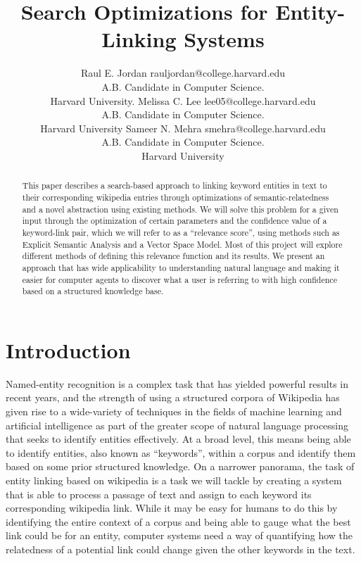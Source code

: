 \documentclass[twoside,11pt]{article}
\begin{document}
\title{Search Optimizations for Entity-Linking Systems}

\author{\name Raul E. Jordan \email rauljordan@college.harvard.edu \\
       \addr A.B. Candidate in Computer Science. \\ Harvard University.
       \AND
       \name Melissa C. Lee \email lee05@college.harvard.edu \\
       \addr A.B. Candidate in Computer Science. \\
       Harvard University
       \AND
       \name Sameer N. Mehra \email smehra@college.harvard.edu \\
       \addr A.B. Candidate in Computer Science. \\
       Harvard University}



\maketitle


\begin{abstract}
This paper describes a search-based approach to linking keyword entities in text to their corresponding wikipedia entries through optimizations of semantic-relatedness and a novel abstraction using existing methods. We will solve this problem for a given input through the optimization of certain parameters and the confidence value of a keyword-link pair, which we will refer to as a ``relevance score'', using methods such as Explicit Semantic Analysis and a Vector Space Model. Most of this project will explore different methods of defining this relevance function and its results. We present an approach that has wide applicability to understanding natural language and making it easier for computer agents to discover what a user is referring to with high confidence based on a structured knowledge base.
\end{abstract}


\section{Introduction}

Named-entity recognition is a complex task that has yielded powerful results in recent years, and the strength of using a structured corpora of Wikipedia has given rise to a wide-variety of techniques in the fields of machine learning and artificial intelligence as part of the greater scope of natural language processing that seeks to identify entities effectively. At a broad level, this means being able to identify entities, also known as ``keywords'', within a corpus and identify them based on some prior structured knowledge. On a narrower panorama, the task of entity linking based on wikipedia is a task we will tackle by creating a system that is able to process a passage of text and assign to each keyword its corresponding wikipedia link. While it may be easy for humans to do this by identifying the entire context of a corpus and being able to gauge what the best link could be for an entity, computer systems need a way of quantifying how the relatedness of a potential link could change given the other keywords in the text.
\end{document}
